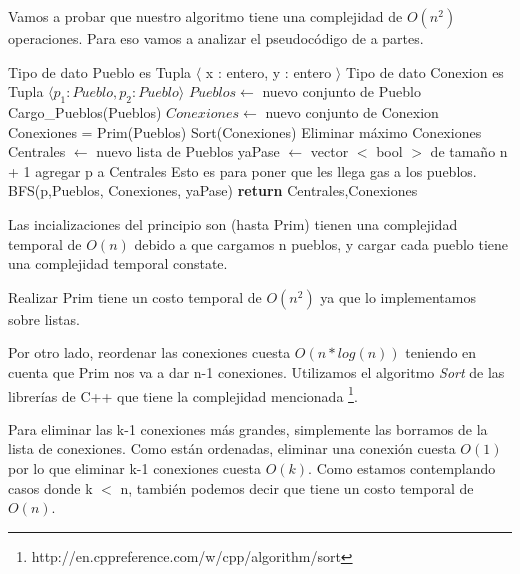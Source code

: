 Vamos a probar que nuestro algoritmo tiene una complejidad de $O(n^2)$ operaciones. Para eso vamos a analizar el pseudocódigo de a partes.

\begin{center}
\begin{pseudo}
\State Tipo de dato Pueblo es Tupla $\langle$ x : entero, y : entero $\rangle$
\State Tipo de dato Conexion es Tupla $\langle p_1 : Pueblo, p_2 : Pueblo \rangle$
        \State $Pueblos \leftarrow$ nuevo conjunto de Pueblo 
        \State Cargo\_Pueblos(Pueblos) 
        \State $Conexiones \leftarrow$ nuevo conjunto de Conexion 
        \State Conexiones = Prim(Pueblos) 
        \State Sort(Conexiones) 
         
	  \State Eliminar máximo Conexiones 
	\EndFor
        \State Centrales $\leftarrow$ nuevo lista de Pueblos 
        \State yaPase $\leftarrow$ vector $<$ bool $>$ de tamaño n + 1 
         
         
        \State agregar p a Centrales 
        \Comment Esto es para poner que les llega gas a los pueblos.
        \State BFS(p,Pueblos, Conexiones, yaPase) 
        \EndIf
        \EndFor
        \State \textbf{return} Centrales,Conexiones 
    \EndProcedure
\end{pseudo}
\end{center}

Las incializaciones del principio son (hasta Prim) tienen una complejidad temporal de $O(n)$ debido a que cargamos n pueblos, y cargar cada pueblo tiene una complejidad temporal constate.

Realizar Prim tiene un costo temporal de $O(n^2)$ ya que lo implementamos sobre listas.

Por otro lado, reordenar las conexiones cuesta $O(n*log(n))$ teniendo en cuenta que Prim nos va a dar n-1 conexiones. Utilizamos el algoritmo \emph{Sort} de las librerías de C++ que tiene la complejidad mencionada \footnote{http://en.cppreference.com/w/cpp/algorithm/sort}.

Para eliminar las k-1 conexiones más grandes, simplemente las borramos de la lista de conexiones. Como están ordenadas, eliminar una conexión cuesta $O(1)$ por lo que eliminar k-1 conexiones cuesta $O(k)$. Como estamos contemplando casos donde k  $<$ n, también podemos decir que tiene un costo temporal de $O(n)$.

